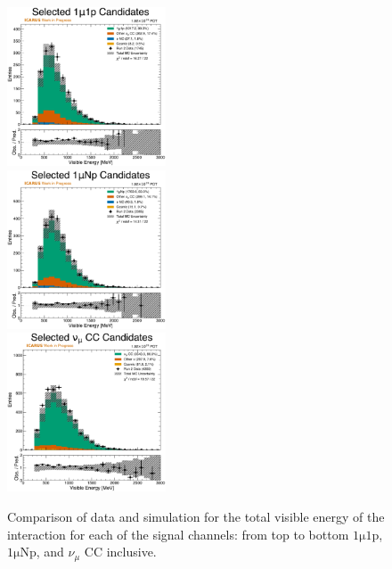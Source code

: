 \begin{figure}
    \centering
    \includegraphics[width=0.42\textwidth]{figures/data_mc_comparisons/datamc_hist1d_1mu1p_visible_energy.pdf}\\
    \includegraphics[width=0.42\textwidth]{figures/data_mc_comparisons/datamc_hist1d_1muNp_visible_energy.pdf}\\
    \includegraphics[width=0.42\textwidth]{figures/data_mc_comparisons/datamc_hist1d_1muX_visible_energy.pdf}\\
    \caption{Comparison of data and simulation for the total visible energy of the interaction for each of the signal channels: from top to bottom $\mathrm{1\mu 1p}$, $\mathrm{1\mu Np}$, and $\nu_\mu$ CC inclusive.}
    \label{fig:datamc_visible_energy}
\end{figure}

